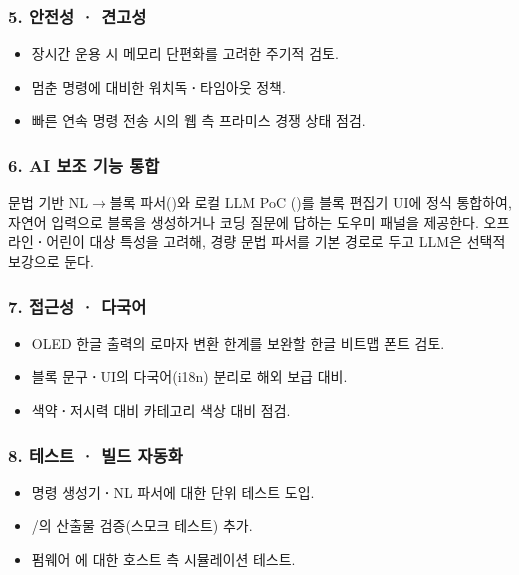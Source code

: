 \subsubsection{5. 안전성 \textbf{·} 견고성}

\begin{itemize}
  \item 장시간 운용 시 메모리 단편화를 고려한 주기적  검토.
  \item 멈춘 명령에 대비한 워치독\textbf{·}타임아웃 정책.
  \item 빠른 연속 명령 전송 시의 웹 측 프라미스 경쟁 상태 점검.
\end{itemize}

\subsubsection{6. AI 보조 기능 통합}

문법 기반 NL$\to$블록 파서()와 로컬 LLM PoC
()를 블록 편집기 UI에 정식 통합하여, 자연어 입력으로 블록을
생성하거나 코딩 질문에 답하는 도우미 패널을 제공한다. 오프라인\textbf{·}어린이
대상 특성을 고려해, 경량 문법 파서를 기본 경로로 두고 LLM은 선택적
보강으로 둔다.

\subsubsection{7. 접근성 \textbf{·} 다국어}

\begin{itemize}
  \item OLED 한글 출력의 로마자 변환 한계를 보완할 한글 비트맵 폰트 검토.
  \item 블록 문구\textbf{·}UI의 다국어(i18n) 분리로 해외 보급 대비.
  \item 색약\textbf{·}저시력 대비 카테고리 색상 대비 점검.
\end{itemize}

\subsubsection{8. 테스트 \textbf{·} 빌드 자동화}

\begin{itemize}
  \item 명령 생성기\textbf{·}NL 파서에 대한 단위 테스트 도입.
  \item {}/의 산출물 검증(스모크 테스트) 추가.
  \item 펌웨어 에 대한 호스트 측 시뮬레이션 테스트.
\end{itemize}

